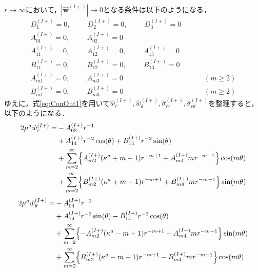 $r\rightarrow\infty$において，$|\hat{\bm{w}}^{(I+)}|\rightarrow0$となる条件は以下のようになる，
\begin{align}
D_{1}^{(I+)}=0,\hspace{1cm}
D_{2}^{(I+)}=0,\hspace{1cm}
D_{3}^{(I+)}=0&
\nonumber
\\
A_{01}^{(I+)}=0,\hspace{1cm}A_{02}^{(I+)}=0&
\nonumber
\\
A_{11}^{(I+)}=0,\hspace{1cm}A_{12}^{(I+)}=0,\hspace{1cm}A_{13}^{(I+)}=0&
\nonumber
\\
B_{11}^{(I+)}=0,\hspace{1cm}B_{12}^{(I+)}=0,\hspace{1cm}B_{13}^{(I+)}=0&
\nonumber
\\
A_{m1}^{(I+)}=0,\hspace{1cm}A_{m3}^{(I+)}=0&\hspace{1cm}(m\geq2)
\nonumber
\\
B_{m1}^{(I+)}=0,\hspace{1cm}B_{m3}^{(I+)}=0&\hspace{1cm}(m\geq2)
\label{eq:ConOut1}
\end{align}
ゆえに，式\eqref{eq:ConOut1}を用いて$\hat{w}_{r}^{(I+)},\hat{w}_{\theta}^{(I+)},\hat{\sigma}_{rr}^{(I+)},\hat{\sigma}_{r\theta}^{(I+)}$を整理すると，以下のようになる．
\begin{align}
	2\mu^{a}\hat{w}_{r}^{(I+)} =&-A_{03}^{(I+)}r^{-1}
	\nonumber
	\\
	&+A_{14}^{(I+)}r^{-2}\cos(\theta)
	+B_{14}^{(I+)}r^{-2}\sin(\theta)
	\nonumber
	\\
	&+\sum_{m=2}^{\infty}\Bigl\{A_{m2}^{(I+)}(\kappa^{a}+m-1)r^{-m+1}
	+A_{m4}^{(I+)}mr^{-m-1}\Bigr\}\cos(m\theta)
	\nonumber
	\\
	&+\sum_{m=2}^{\infty}\Bigl\{B_{m2}^{(I+)}(\kappa^{a}+m-1)r^{-m+1}
	+B_{m4}^{(I+)}mr^{-m-1}\Bigr\}\sin(m\theta)
	\label{eq:UROut1}
\end{align}
\begin{align}
	2\mu^{a}\hat{w}_{\theta}^{(I+)} =&-A_{04}^{(I+)}r^{-1}
	\nonumber
	\\
	&+A_{14}^{(I+)}r^{-2}\sin(\theta)
	-B_{14}^{(I+)}r^{-2}\cos(\theta)
	\nonumber
	\\
	&+\sum_{m=2}^{\infty}\Bigl\{-A_{m2}^{(I+)}(\kappa^{a}-m+1)r^{-m+1}
	+A_{m4}^{(I+)}mr^{-m-1}\Bigr\}\sin(m\theta)
	\nonumber
	\\
	&+\sum_{m=2}^{\infty}\Bigl\{B_{m2}^{(I+)}(\kappa^{a}-m+1)r^{-m+1}
	-B_{m4}^{(I+)}mr^{-m-1}\Bigr\}\cos(m\theta)
	\label{eq:UThOut1}
\end{align}
